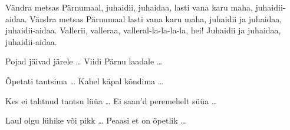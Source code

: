 V\"andra metsas P\"arnumaal, juhaidii, juhaidaa,
lasti vana karu maha, juhaidii-aidaa.
V\"andra metsas P\"arnumaal lasti vana karu maha,
juhaidii ja juhaidaa,
juhaidii-aidaa.
Vallerii, valleraa,
valleral-la-la-la-la, hei!
Juhaidii ja juhaidaa,
juhaidii-aidaa.

Pojad j\"aivad j\"arele \ldots
Viidi P\"arnu laadale \ldots

\~Opetati tantsima \ldots
Kahel k\"apal k\~ondima \ldots

Kes ei tahtnud tantsu l\"u\"ua \ldots
Ei saan'd peremehelt s\"u\"ua \ldots

Laul olgu l\"uhike v\~oi pikk \ldots
Peaasi et on \~opetlik \ldots